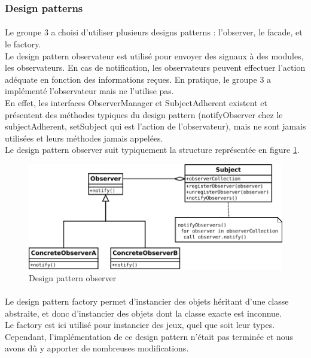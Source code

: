     \subsubsection{Design patterns}
        \label{subsubsection:design}
        \paragraph{}
        Le groupe 3 a choisi d'utiliser plusieurs designs patterns : l'observer, le facade, et le factory. \\
        Le design pattern observateur est utilisé pour envoyer des signaux à des modules, les observateurs. En cas de notification, les observateurs peuvent effectuer l'action adéquate en fonction des informations reçues. En pratique, le groupe 3 a implémenté l'observateur mais ne l'utilise pas. \\
        En effet, les interfaces ObserverManager et SubjectAdherent existent et présentent des méthodes typiques du design pattern (notifyObserver chez le subjectAdherent, setSubject qui est l'action de l'observateur), mais ne sont jamais utilisées et leurs méthodes jamais appelées. \\
        Le design pattern observer suit typiquement la structure représentée en figure \ref{fig:observer}.
        \begin{figure}[h!]
                \centering
                \includegraphics[width=\textwidth,center]{Figures/Observer.png}
                \caption{Design pattern observer}
                \label{fig:observer}
        \end{figure}
        \newpage{}
        \paragraph{}
        Le design pattern factory permet d'instancier des objets héritant d'une classe abstraite, et donc d'instancier des objets dont la classe exacte est inconnue. \\
        Le factory est ici utilisé pour instancier des jeux, quel que soit leur types. Cependant, l'implémentation de ce design pattern n'était pas terminée et nous avons dû y apporter de nombreuses modifications. 
